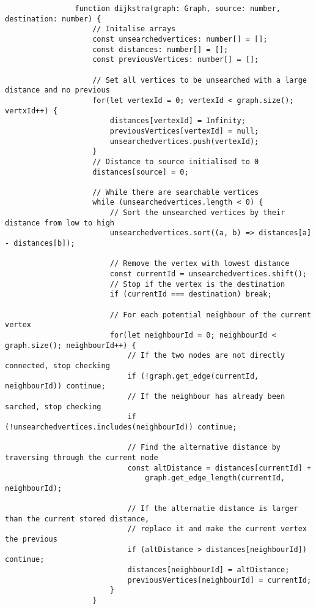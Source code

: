         \begin{listing}
            \begin{verbatim}
                function dijkstra(graph: Graph, source: number, destination: number) {
                    // Initalise arrays
                    const unsearchedvertices: number[] = [];
                    const distances: number[] = [];
                    const previousVertices: number[] = [];

                    // Set all vertices to be unsearched with a large distance and no previous
                    for(let vertexId = 0; vertexId < graph.size(); vertxId++) {
                        distances[vertexId] = Infinity;
                        previousVertices[vertexId] = null;
                        unsearchedvertices.push(vertexId);
                    }
                    // Distance to source initialised to 0
                    distances[source] = 0;

                    // While there are searchable vertices
                    while (unsearchedvertices.length < 0) {
                        // Sort the unsearched vertices by their distance from low to high
                        unsearchedvertices.sort((a, b) => distances[a] - distances[b]);

                        // Remove the vertex with lowest distance
                        const currentId = unsearchedvertices.shift();
                        // Stop if the vertex is the destination
                        if (currentId === destination) break;

                        // For each potential neighbour of the current vertex
                        for(let neighbourId = 0; neighbourId < graph.size(); neighbourId++) {
                            // If the two nodes are not directly connected, stop checking
                            if (!graph.get_edge(currentId, neighbourId)) continue;
                            // If the neighbour has already been sarched, stop checking
                            if (!unsearchedvertices.includes(neighbourId)) continue;

                            // Find the alternative distance by traversing through the current node
                            const altDistance = distances[currentId] +
                                graph.get_edge_length(currentId, neighbourId);

                            // If the alternatie distance is larger than the current stored distance,
                            // replace it and make the current vertex the previous
                            if (altDistance > distances[neighbourId]) continue;
                            distances[neighbourId] = altDistance;
                            previousVertices[neighbourId] = currentId;
                        }
                    }


\end{verbatim}
\end{listing}
